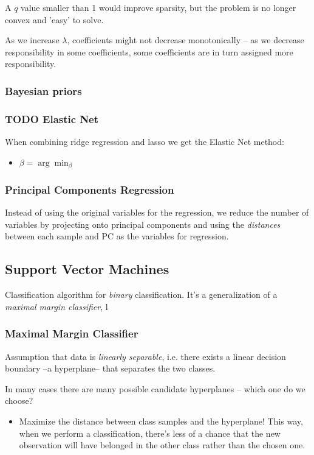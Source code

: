 \documentclass[11pt]{article}
\begin{document}
\begin{itemize}
A $q$ value smaller than 1 would improve sparsity, but the problem is no longer convex and 'easy' to solve.

As we increase $\lambda$, coefficients might not decrease monotonically -- as we decrease responsibility in some coefficients, some coefficients are in turn assigned more responsibility.

\subsubsection*{Bayesian priors}
\label{sec-4-1-2}

\subsubsection*{{\bfseries\sffamily TODO} Elastic Net}
\label{sec-4-1-3}
When combining ridge regression and lasso we get the Elastic Net method:

\begin{itemize}
\item $\beta = \arg\min_{\beta}$
\end{itemize}

\subsubsection*{Principal Components Regression}
\label{sec-4-1-4}
Instead of using the original variables for the regression, we reduce the number of variables by projecting onto principal components and using the \emph{distances} between each sample and PC as the variables for regression.

\subsection{Support Vector Machines}
\label{sec-4-2}
Classification algorithm for \emph{binary} classification. It's a generalization of a \emph{maximal margin classifier}, l

\subsubsection*{Maximal Margin Classifier}
\label{sec-4-2-1}
Assumption that data is \emph{linearly separable}, i.e. there exists a linear decision boundary --a hyperplane-- that separates the two classes.

In many cases there are many possible candidate hyperplanes -- which one do we choose?
\begin{itemize}
\item Maximize the distance between class samples and the hyperplane! This way, when we perform a classification, there's less of a chance that the new observation will have belonged in the other class rather than the chosen one.
\end{itemize}


\end{itemize}
\end{document}
